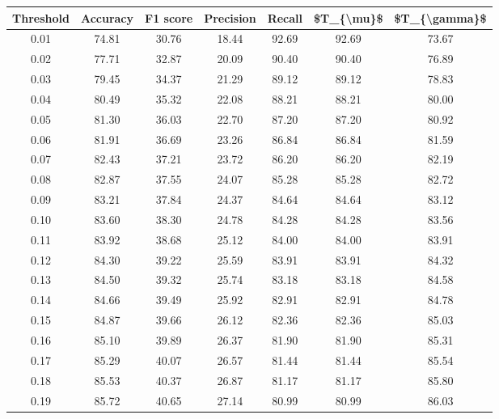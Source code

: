 \begin{tabular}{|c|c|c|c|c|c|c|}
\hline
 Threshold &  Accuracy &  F1 score &  Precision &  Recall &  \$T\_\{\textbackslash mu\}\$ &  \$T\_\{\textbackslash gamma\}\$ \\
\hline
      0.01 &     74.81 &     30.76 &      18.44 &   92.69 &      92.69 &         73.67 \\
      0.02 &     77.71 &     32.87 &      20.09 &   90.40 &      90.40 &         76.89 \\
      0.03 &     79.45 &     34.37 &      21.29 &   89.12 &      89.12 &         78.83 \\
      0.04 &     80.49 &     35.32 &      22.08 &   88.21 &      88.21 &         80.00 \\
      0.05 &     81.30 &     36.03 &      22.70 &   87.20 &      87.20 &         80.92 \\
      0.06 &     81.91 &     36.69 &      23.26 &   86.84 &      86.84 &         81.59 \\
      0.07 &     82.43 &     37.21 &      23.72 &   86.20 &      86.20 &         82.19 \\
      0.08 &     82.87 &     37.55 &      24.07 &   85.28 &      85.28 &         82.72 \\
      0.09 &     83.21 &     37.84 &      24.37 &   84.64 &      84.64 &         83.12 \\
      0.10 &     83.60 &     38.30 &      24.78 &   84.28 &      84.28 &         83.56 \\
      0.11 &     83.92 &     38.68 &      25.12 &   84.00 &      84.00 &         83.91 \\
      0.12 &     84.30 &     39.22 &      25.59 &   83.91 &      83.91 &         84.32 \\
      0.13 &     84.50 &     39.32 &      25.74 &   83.18 &      83.18 &         84.58 \\
      0.14 &     84.66 &     39.49 &      25.92 &   82.91 &      82.91 &         84.78 \\
      0.15 &     84.87 &     39.66 &      26.12 &   82.36 &      82.36 &         85.03 \\
      0.16 &     85.10 &     39.89 &      26.37 &   81.90 &      81.90 &         85.31 \\
      0.17 &     85.29 &     40.07 &      26.57 &   81.44 &      81.44 &         85.54 \\
      0.18 &     85.53 &     40.37 &      26.87 &   81.17 &      81.17 &         85.80 \\
      0.19 &     85.72 &     40.65 &      27.14 &   80.99 &      80.99 &         86.03 \\

\end{tabular}
